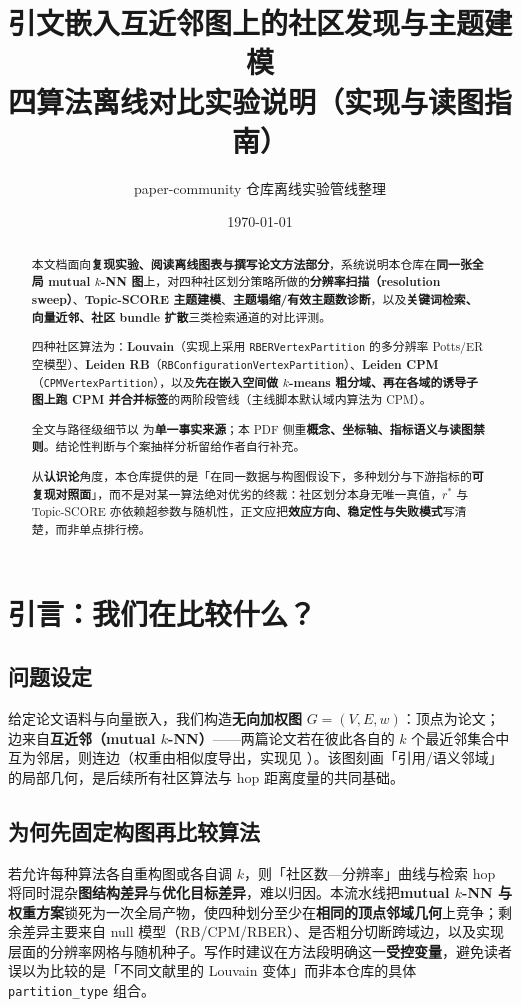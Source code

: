 \documentclass[UTF8,a4paper,11pt,fontset=fandol]{ctexart}
\title{引文嵌入互近邻图上的社区发现与主题建模\\{\large 四算法离线对比实验说明（实现与读图指南）}}
\author{paper-community 仓库离线实验管线整理}
\date{\today}
\begin{document}
\sloppy
\setlength{\emergencystretch}{2.8em plus .8em minus .4em}

\maketitle

\begin{abstract}
本文档面向\textbf{复现实验、阅读离线图表与撰写论文方法部分}，系统说明本仓库在\textbf{同一张全局 mutual $k$-NN 图}上，对四种社区划分策略所做的\textbf{分辨率扫描（resolution sweep）}、\textbf{Topic-SCORE 主题建模}、\textbf{主题塌缩/有效主题数诊断}，以及\textbf{关键词检索、向量近邻、社区 bundle 扩散}三类检索通道的对比评测。

四种社区算法为：\textbf{Louvain}（实现上采用 \texttt{RBERVertexPartition} 的多分辨率 Potts/ER 空模型）、\textbf{Leiden RB}（\texttt{RBConfigurationVertexPartition}）、\textbf{Leiden CPM}（\texttt{CPMVertexPartition}），以及\textbf{先在嵌入空间做 $k$-means 粗分域、再在各域的诱导子图上跑 CPM 并合并标签}的两阶段管线（主线脚本默认域内算法为 CPM）。

全文与路径级细节以  为\textbf{单一事实来源}；本 PDF 侧重\textbf{概念、坐标轴、指标语义与读图禁则}。结论性判断与个案抽样分析留给作者自行补充。

从\textbf{认识论}角度，本仓库提供的是「在同一数据与构图假设下，多种划分与下游指标的\textbf{可复现对照面}」，而不是对某一算法绝对优劣的终裁：社区划分本身无唯一真值，$r^\ast$ 与 Topic-SCORE 亦依赖超参数与随机性，正文应把\textbf{效应方向、稳定性与失败模式}写清楚，而非单点排行榜。
\end{abstract}

\tableofcontents
\newpage

\section{引言：我们在比较什么？}

\subsection{问题设定}
给定论文语料与向量嵌入，我们构造\textbf{无向加权图} $G=(V,E,w)$：顶点为论文；边来自\textbf{互近邻（mutual $k$-NN）}——两篇论文若在彼此各自的 $k$ 个最近邻集合中互为邻居，则连边（权重由相似度导出，实现见 ）。该图刻画「引用/语义邻域」的局部几何，是后续所有社区算法与 hop 距离度量的共同基础。

\subsection{为何先固定构图再比较算法}
若允许每种算法各自重构图或各自调 $k$，则「社区数—分辨率」曲线与检索 hop 将同时混杂\textbf{图结构差异}与\textbf{优化目标差异}，难以归因。本流水线把\textbf{mutual $k$-NN 与权重方案}锁死为一次全局产物，使四种划分至少在\textbf{相同的顶点邻域几何}上竞争；剩余差异主要来自 null 模型（RB/CPM/RBER）、是否粗分切断跨域边，以及实现层面的分辨率网格与随机种子。写作时建议在方法段明确这一\textbf{受控变量}，避免读者误以为比较的是「不同文献里的 Louvain 变体」而非本仓库的具体 \texttt{partition\_type} 组合。
\end{document}

